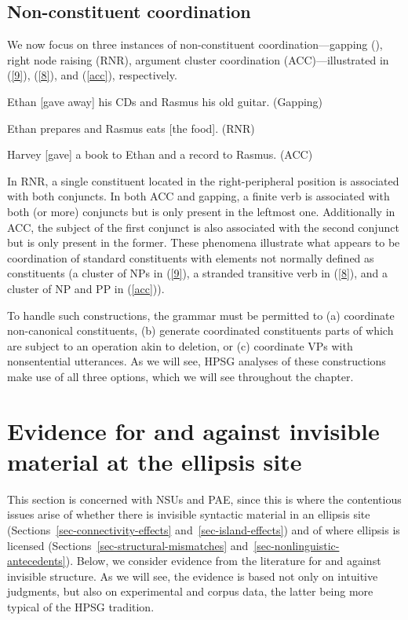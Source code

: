 {\subsection{Non-constituent coordination}

We now focus on three instances of non-constituent coordination---gapping (\citealt{Ross1967}), right node raising (RNR), argument cluster coordination (ACC)---illustrated in (\ref{9}), (\ref{8}), and (\ref{acc}), respectively.

 \ea Ethan [gave away] his CDs and Rasmus his old guitar. (Gapping)\label{9}\z

 \ea %
 Ethan prepares and Rasmus eats [the food]. (RNR)
 \label{8}\z

\ea Harvey [gave] a book to Ethan and a record to Rasmus. (ACC) \label{acc}\z

In RNR, a single constituent located in the right-peripheral position is associated with both conjuncts. In both ACC and gapping, a finite verb is associated with both (or more) conjuncts but is only present in the leftmost one. Additionally in ACC, the subject of the first conjunct is also associated with the second conjunct but is only present in the former. These phenomena illustrate what appears to be coordination of standard constituents with elements not normally defined as constituents (a cluster of NPs in (\ref{9}), a stranded transitive verb in (\ref{8}), and a cluster of NP and PP in (\ref{acc})).
%

 To handle such constructions, the grammar must be permitted to (a) coordinate non-canonical constituents, (b) generate coordinated constituents parts of which are subject to an operation akin to deletion, or (c) coordinate VPs with nonsentential utterances. As we will see, HPSG analyses of these constructions make use of all three options, which we will see throughout the chapter.

\section{Evidence for and against invisible material at the ellipsis site}
\label{sec-evidence-for-invisible-material}

This section is concerned with NSUs and PAE, since this is where the contentious issues arise of
 whether there is invisible syntactic material in an ellipsis site (Sections~\ref{sec-connectivity-effects} and~\ref{sec-island-effects}) and of where ellipsis is licensed (Sections~\ref{sec-structural-mismatches} and~\ref{sec-nonlinguistic-antecedents}).  Below, we consider evidence from the literature for and against invisible structure. As we will see, the evidence is based not only on intuitive judgments, but also on experimental and corpus data, the latter being more typical of the HPSG tradition.


}
